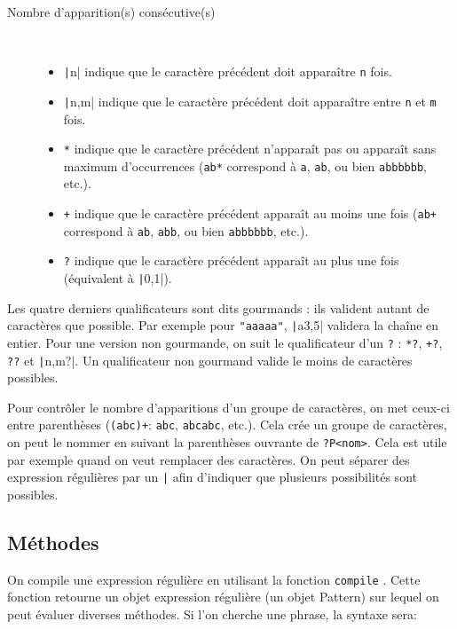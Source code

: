 \documentclass[a4paper, 10pt]{article}
\begin{document}
\begin{description}
\begin{itemize}
            \end{itemize}
            \item [Nombre d'apparition(s) consécutive(s)]~
            \begin{itemize}
              \item \og\texttt|{n}|\fg{} indique que le caractère précédent doit apparaître \texttt{n} fois.
              \item \og\texttt|{n,m}|\fg{} indique que le caractère précédent doit apparaître entre \texttt{n} et \texttt{m} fois.
              \item \og\texttt{*}\fg{} indique que le caractère précédent n'apparaît pas ou apparaît sans maximum d'occurrences (\texttt{ab*} correspond à \texttt{a}, \texttt{ab}, ou bien \texttt{abbbbbb}, etc.).
              \item \og\texttt{+}\fg{} indique que le caractère précédent apparaît au moins une fois (\texttt{ab+} correspond à \texttt{ab}, \texttt{abb}, ou bien \texttt{abbbbbb}, etc.).
              \item \og\texttt{?}\fg{} indique que le caractère précédent apparaît au plus une fois (équivalent à \texttt|{0,1}|).
          \end{itemize}
\end{description}

Les quatre derniers qualificateurs sont dits gourmands : ils valident autant de caractères que possible. Par exemple pour \texttt{"aaaaa"}, \texttt|a{3,5}| validera la chaîne en entier. Pour une version non gourmande, on suit le qualificateur d'un \texttt{?} : \texttt{*?}, \texttt{+?}, \texttt{??} et \texttt|{n,m}?|. Un qualificateur non gourmand valide le moins de caractères possibles.\medskip

Pour contrôler le nombre d'apparitions d'un groupe de caractères, on met ceux-ci entre parenthèses (\texttt{(abc)+}: \texttt{abc}, \texttt{abcabc}, etc.). Cela crée un groupe de caractères, on peut le nommer en suivant la parenthèses ouvrante de \texttt{?P<nom>}. Cela est utile par exemple quand on veut remplacer des caractères. On peut séparer des expression régulières par un \texttt{|} afin d'indiquer que plusieurs possibilités sont possibles.\medskip

\subsection{Méthodes}
On compile une expression régulière en utilisant la fonction \texttt{compile} . Cette fonction retourne un objet expression régulière (un objet Pattern) sur lequel on peut évaluer diverses méthodes. Si l'on cherche une phrase, la syntaxe sera:
\end{document}
